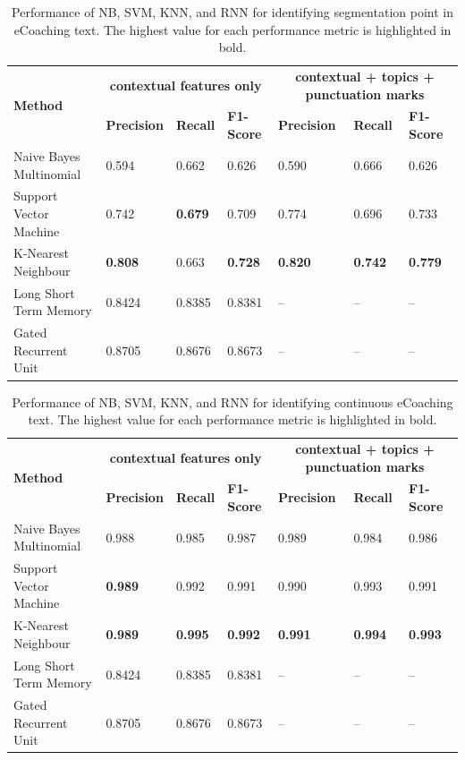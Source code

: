 \documentclass{amia}
\begin{document}
\begin{table}[ht]
\centering
\caption{Performance of NB, SVM, KNN, and RNN for identifying segmentation point in eCoaching text. The highest value for each performance metric is highlighted in bold.}
\label{tab:result_under_over_sampled}
  \begin{tabular}{|l|l|l|l|l|l|l|}
  \hline
   \multirow{2}{*}{\textbf{Method}} & \multicolumn{3}{|c|}{\textbf{contextual features only}} & \multicolumn{3}{|c|}{\textbf{contextual + topics + punctuation marks}} \\\cline{2-7}
   & \textbf{Precision}  & \textbf{Recall} & \textbf{F1-Score} & \textbf{Precision}  & \textbf{Recall} & \textbf{F1-Score}\\ \hline    
    
 Naive Bayes Multinomial & 0.594 & 0.662 & 0.626 & 0.590 & 0.666 & 0.626 \\ \hline
 Support Vector Machine & 0.742 & \textbf{0.679} & 0.709 & 0.774 & 0.696 & 0.733\\ \hline
 K-Nearest Neighbour & \textbf{0.808} & 0.663 & \textbf{0.728} & \textbf{0.820} & \textbf{0.742} & \textbf{0.779}\\ \hline
 Long Short Term Memory & 0.8424 & 0.8385 & 0.8381  & -- & -- & --\\ \hline
 Gated Recurrent Unit & 0.8705 & 0.8676 & 0.8673 & -- & -- & --\\ \hline 
  \end{tabular}
\end{table} 

\begin{table}[ht]
\centering
\caption{Performance of NB, SVM, KNN, and RNN for identifying continuous eCoaching text. The highest value for each performance metric is highlighted in bold.}
\label{tab:result_under_over_sampled}
  \begin{tabular}{|l|l|l|l|l|l|l|}
  \hline
   \multirow{2}{*}{\textbf{Method}} & \multicolumn{3}{|c|}{\textbf{contextual features only}} & \multicolumn{3}{|c|}{\textbf{contextual + topics + punctuation marks}} \\\cline{2-7}
   & \textbf{Precision}  & \textbf{Recall} & \textbf{F1-Score} & \textbf{Precision}  & \textbf{Recall} & \textbf{F1-Score}\\ \hline    
    
 Naive Bayes Multinomial & 0.988 & 0.985 & 0.987 & 0.989 & 0.984 & 0.986 \\ \hline
 Support Vector Machine & \textbf{0.989} & 0.992 & 0.991 & 0.990 & 0.993 & 0.991\\ \hline
 K-Nearest Neighbour & \textbf{0.989} & \textbf{0.995} & \textbf{0.992} & \textbf{0.991} & \textbf{0.994} & \textbf{0.993}\\ \hline
 Long Short Term Memory & 0.8424 & 0.8385 & 0.8381 & -- & -- & --\\ \hline
 Gated Recurrent Unit & 0.8705 & 0.8676 & 0.8673 & -- & -- & --\\ \hline 
  \end{tabular}
\end{table}
\end{document}

